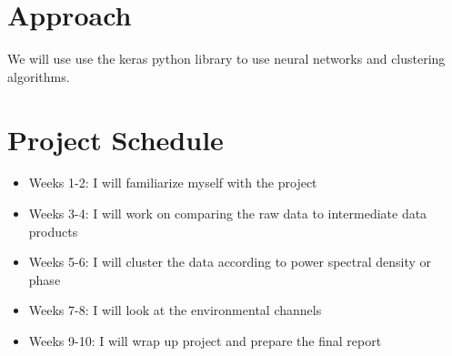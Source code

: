 \documentclass[colorlinks=true,pdfstartview=FitV,linkcolor=blue,
            citecolor=red,urlcolor=magenta]{ligodoc}
\begin{document}
\section{Approach}
We will use use the keras python library to use neural networks and clustering algorithms. 

\section{Project Schedule}

\begin{itemize}
\item Weeks 1-2: I will familiarize myself with the project
\item Weeks 3-4: I will work on comparing the raw data to intermediate data products
\item Weeks 5-6: I will cluster the data according to power spectral density or phase
\item Weeks 7-8: I will look at the environmental channels
\item Weeks 9-10: I will wrap up project and prepare the final report
\end{itemize}
\end{document}
